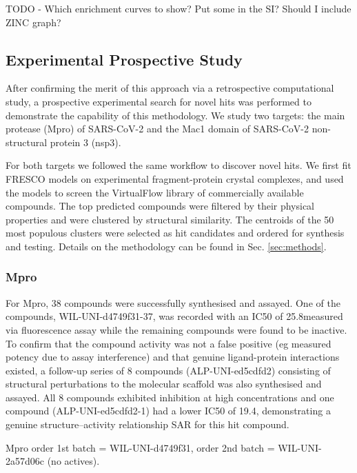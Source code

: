 TODO - Which enrichment curves to show? Put some in the SI? Should I include ZINC graph?

\subsection{Experimental Prospective Study}
After confirming the merit of this approach via a retrospective computational study, a prospective experimental search for novel hits was performed to demonstrate the capability of this methodology. We study two targets: the main protease (Mpro) of SARS-CoV-2 and the Mac1 domain of SARS-CoV-2 non-structural protein 3 (nsp3). 

For both targets we followed the same workflow to discover novel hits. We first fit FRESCO models on experimental fragment-protein crystal complexes, and used the models to screen the VirtualFlow \cite{Gorgulla2020VirtualFlow} library of commercially available compounds. The top predicted compounds were filtered by their physical properties and were clustered by structural similarity. The centroids of the 50 most populous clusters were selected as hit candidates and ordered for synthesis and testing. Details on the methodology can be found in Sec. \ref{sec:methods}.

\subsubsection{Mpro}
For Mpro, 38 compounds were successfully synthesised and assayed. One of the compounds, WIL-UNI-d4749f31-37, was recorded with an IC50 of 25.8\uM measured via fluorescence assay while the remaining compounds were found to be inactive. To confirm that the compound activity was not a false positive (eg measured potency due to assay interference) and that genuine ligand-protein interactions existed, a follow-up series of 8 compounds (ALP-UNI-ed5cdfd2) consisting of structural perturbations to the molecular scaffold was also synthesised and assayed. All 8 compounds exhibited inhibition at high concentrations and one compound (ALP-UNI-ed5cdfd2-1) had a lower IC50 of 19.4\uM, demonstrating a genuine structure–activity relationship SAR for this hit compound.

Mpro order 1st batch = WIL-UNI-d4749f31, order 2nd batch = WIL-UNI-2a57d06c (no actives). 

